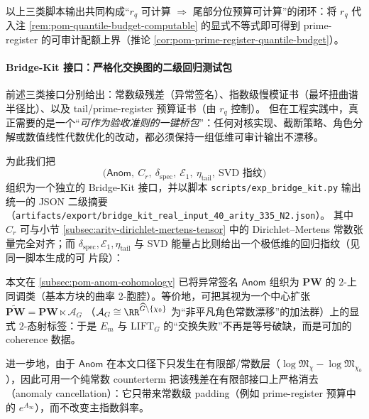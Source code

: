 以上三类脚本输出共同构成“\(r_q\) 可计算 \(\Rightarrow\) 尾部分位预算可计算”的闭环：将 \(r_q\) 代入注 \ref{rem:pom-quantile-budget-computable} 的显式不等式即可得到 prime-register 的可审计配额上界（推论 \ref{cor:pom-prime-register-quantile-budget}）。

\paragraph{Bridge-Kit 接口：严格化交换图的二级回归测试包}
前述三类接口分别给出：常数级残差（异常签名）、指数级慢模证书（最坏扭曲谱半径比）、以及 tail/prime-register 预算证书（由 \(r_q\) 控制）。
但在工程实践中，真正需要的是一个“\emph{可作为验收准则的一键桥包}”：任何对核实现、截断策略、角色分解或数值线性代数优化的改动，都必须保持一组低维可审计输出不漂移。
\par
为此我们把
\[
\bigl(\mathsf{Anom},\ C_r,\ \delta_{\mathrm{spec}},\ \mathcal{E}_1,\ \eta_{\mathrm{tail}},\ \text{SVD 指纹}\bigr)
\]
组织为一个独立的 Bridge-Kit 接口，并以脚本
\texttt{scripts/exp\_bridge\_kit.py}
输出统一的 JSON 二级摘要（\texttt{artifacts/export/bridge\_kit\_real\_input\_40\_arity\_335\_N2.json}）。
其中 \(C_r\) 可与小节 \ref{subsec:arity-dirichlet-mertens-tensor} 中的 Dirichlet--Mertens 常数张量完全对齐；而 \(\delta_{\mathrm{spec}},\mathcal{E}_1,\eta_{\mathrm{tail}}\) 与 SVD 能量占比则给出一个极低维的回归指纹（见同一脚本生成的可 \verb|| 片段）：


\begin{remark}\label{rem:pom-bridge-kit-strictification}
本文在 \ref{subsec:pom-anom-cohomology} 已将异常签名 \(\mathsf{Anom}\) 组织为 \(\mathbf{PW}\) 的 \(2\)-上同调类（基本方块的曲率 \(2\)-胞腔）。等价地，可把其视为一个中心扩张
\(
\widetilde{\mathbf{PW}}=\mathbf{PW}\ltimes \mathcal{A}_G
\)
（\(\mathcal{A}_G\cong\RR^{\widehat G\setminus\{\chi_0\}}\) 为“非平凡角色常数漂移”的加法群）上的显式 \(2\)-态射标签：于是 \(E_m\) 与 \(\mathrm{LIFT}_G\) 的“交换失败”不再是等号破缺，而是可加的 coherence 数据。
\par
进一步地，由于 \(\mathsf{Anom}\) 在本文口径下只发生在有限部/常数层（\(\log\mathfrak{M}_\chi-\log\mathfrak{M}_{\chi_0}\)），因此可用一个纯常数 counterterm 把该残差在有限部接口上严格消去（anomaly cancellation）：它只带来常数级 padding（例如 prime-register 预算中的 \(e^{A_\infty}\)），而不改变主指数斜率。
\end{remark}

